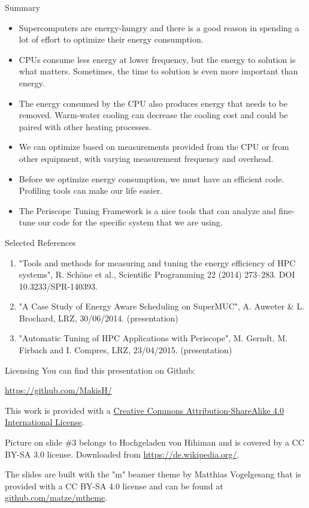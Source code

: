 \documentclass[10pt, compress]{beamer}
\begin{document}
\begin{frame}[fragile]{Summary}
\begin{itemize}[<+- | alert@+>]
    \item Supercomputers are energy-hungry and there is a good reason in spending a lot of effort 
    to optimize their energy consumption.
    \item CPUs consume less energy at lower frequency, but the energy to solution is what matters. Sometimes, the time to solution is even more important than energy.
    \item The energy consumed by the CPU also produces energy that needs to be removed. Warm-water cooling 
    can decrease the cooling cost and could be paired with other heating processes.
    \item We can optimize based on measurements provided from the CPU or from other equipment, with varying measurement frequency and overhead.
    \item Before we optimize energy consumption, we must have an efficient code. Profiling tools can make our life easier.
    \item The Periscope Tuning Framework is a nice tools that can analyze and fine-tune our code for the specific system that we are using.
\end{itemize}
\end{frame}

\begin{frame}[fragile]{Selected References}
\begin{enumerate}
\item "Tools and methods for measuring and tuning the energy efficiency of HPC systems",
R. Schöne et al., Scientific Programming 22 (2014) 273–283. DOI 10.3233/SPR-140393.
\item "A Case Study of Energy Aware Scheduling on SuperMUC", A. Auweter \& L. Brochard, LRZ, 
30/06/2014. (presentation)
\item "Automatic Tuning of HPC Applications with Periscope", M. Gerndt, M. Firbach and I. Compres, LRZ, 23/04/2015. (presentation)
\end{enumerate}
\end{frame}

\begin{frame}[fragile]{Licensing}
    You can find this presentation on Github:
    \begin{center}\url{https://github.com/MakisH/}\end{center}

  This work is provided with a
  \href{http://creativecommons.org/licenses/by-sa/4.0/}{Creative Commons
  Attribution-ShareAlike 4.0 International License}.

  \begin{center}\ccbysa\end{center}
  
  Picture on slide \#3 belongs to Hochgeladen von Hihiman and is covered by a CC BY-SA 3.0 license. Downloaded from \url{https://de.wikipedia.org/}.
  
  The slides are built with the "m" beamer theme by Matthias Vogelgesang that is provided with a CC BY-SA 4.0 license  and can be found at \url{github.com/matze/mtheme}.
\end{frame}

\end{document}

